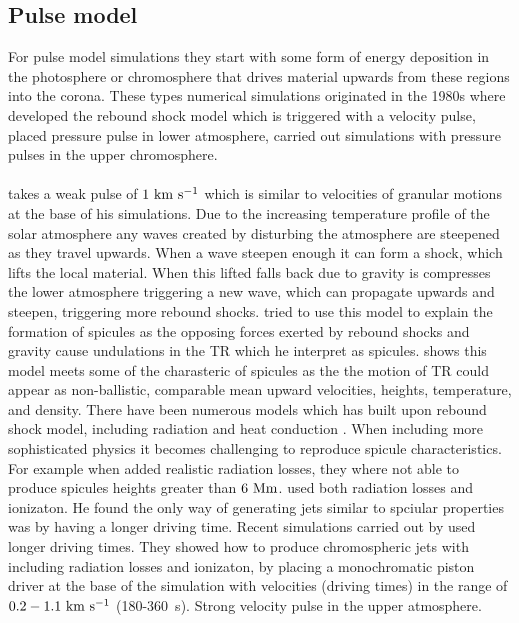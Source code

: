\documentclass[12pt]{ociamthesis}
\newcommand{\kms}{~\rm{km ~s^{-1}}}
\newcommand{\np}{\\ \\}
\begin{document}
\subsection{Pulse model}
\label{ssec:pulse_model}
For pulse model simulations they start with some form of energy deposition in the photosphere or chromosphere that drives material upwards from these regions into the corona. These types numerical simulations originated in the 1980s where \cite{Hollweg1982ApJ257345H} developed the rebound shock model which is triggered with a velocity pulse, \cite{Suematsu1982SoPh7599S} placed pressure pulse in lower atmosphere, \cite{Shibata1982} carried out simulations with pressure pulses in the upper chromosphere. \np
%
\cite{Hollweg1982ApJ257345H} takes a weak pulse of $1\kms$ which is similar to velocities of granular motions at the base of his simulations. Due to the increasing temperature profile of the solar atmosphere any waves created by disturbing the atmosphere are steepened as they travel upwards. When a wave steepen enough it can form a shock, which lifts the local material. When this lifted falls back due to gravity is compresses the lower atmosphere triggering a new wave, which can propagate upwards and steepen, triggering more rebound shocks. \cite{Hollweg1982ApJ257345H} tried to use this model to explain the formation of spicules as the opposing forces exerted by rebound shocks and gravity cause undulations in the TR which he interpret as spicules. \cite{Hollweg1982ApJ257345H} shows this model meets some of the charasteric of spicules as the the motion of TR could appear as non-ballistic, comparable mean upward velocities, heights, temperature, and density. There have been numerous models which has built upon rebound shock model, including radiation and heat conduction \citep{Sterling1988ApJ327950S, Sterling1990ApJ349647S, Cheng1992AA266549C, Cheng1992AA262581C, Cheng1992AA266537C}. When including more sophisticated physics it becomes challenging to reproduce spicule characteristics. For example when \cite{Sterling1990ApJ349647S} added realistic radiation losses, they where not able to produce spicules heights greater than $6~\rm{Mm}$. \cite{Cheng1992AA266549C, Cheng1992AA266537C} used both radiation losses and ionizaton. He found the only way of generating jets similar to spciular properties was by having a longer driving time. Recent simulations carried out by \cite{Heggland2007ApJ6661277H} used longer driving times. They showed how to produce chromospheric jets with including radiation losses and ionizaton, by placing a monochromatic piston driver at the base of the simulation with velocities (driving times) in the range of $0.2-1.1\kms$ (180-360~\rm{s}).
%
Strong velocity pulse in the upper atmosphere. 
\end{document}
